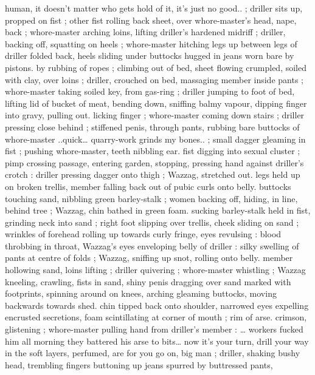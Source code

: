 {%
human, it doesn't matter who gets hold of it, it's just no good..{\gr} ; 
driller sits up, propped on fist ; other fist rolling back sheet, over 
whore-master's head, nape, back ; whore-master arching loins, lifting 
driller's hardened midriff ; driller, backing off, squatting on heels ; 
whore-master hitching legs up between legs of driller folded back, 
heels sliding under buttocks hugged in jeans worn bare by pistons. 
by rubbing of ropes ; climbing out of bed, sheet flowing crumpled, 
soiled with clay, over loins ; driller, crouched on bed, massaging 
member inside pants ; whore-master taking soiled key, from gas-ring 
; driller jumping to foot of bed, lifting lid of bucket of meat, bending 
down, sniffing balmy vapour, dipping finger into gravy, pulling out. 
licking finger ; whore-master coming down stairs ; driller pressing 
close behind ; stiffened penis, through pants, rubbing bare buttocks 
of whore-master{\td} {\gl}..quick{\ldots} quarry-work grinds my bones..{\gr} ; small 
dagger gleaming in fist ; pushing whore-master, teeth nibbling ear. 
fist digging into sexual cluster ; pimp crossing passage, entering 
garden, stopping, pressing hand against driller's crotch : driller 
pressing dagger onto thigh ; Wazzag, stretched out. legs held up on 
broken trellis, member falling back out of pubic curls onto belly. 
buttocks touching sand, nibbling green barley-stalk ; women backing 
off, hiding, in line, behind tree ; Wazzag, chin bathed in green foam. 
sucking barley-stalk held in fist, grinding neck into sand ; right foot 
slipping over trellis, cheek sliding on sand ; wrinkles of forehead 
rolling up towards curly fringe, eyes revulsing : blood throbbing in 
throat, Wazzag's eyes enveloping belly of driller : silky swelling of 
pants at centre of folds ; Wazzag, sniffing up snot, rolling onto belly. 
member hollowing sand, loins lifting ; driller quivering ; whore-master 
whistling ; Wazzag kneeling, crawling, fists in sand, shiny penis 
dragging over sand marked with footprints, spinning around on 
knees, arching gleaming buttocks, moving backwards towards shed. 
chin tipped back onto shoulder, narrowed eyes expelling encrusted 
secretions, foam scintillating at corner of mouth ; rim of arse. 
crimson, glistening ; whore-master pulling hand from driller's 
member : {\td} {\gl} {\ldots} workers fucked him all morning{\td} they battered his 
arse to bits{\ldots} now it's your turn, drill your way in{\td} the soft layers, 
perfumed, are for you{\td} go on, big man {\gr} ; driller, shaking bushy head, 
trembling fingers buttoning up jeans spurred by buttressed pants, 
}
